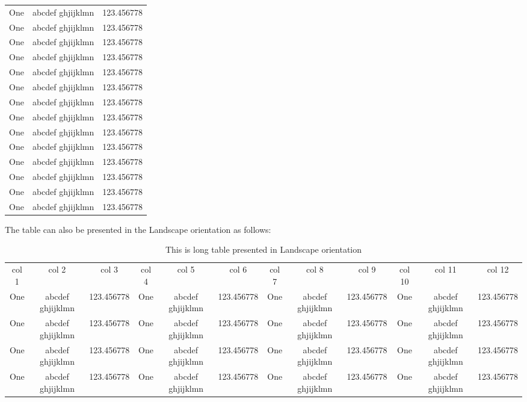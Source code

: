 \begin{longtable}{|l|l|l|}
	One & abcdef ghjijklmn & 123.456778 \\
	One & abcdef ghjijklmn & 123.456778 \\
	One & abcdef ghjijklmn & 123.456778 \\
	One & abcdef ghjijklmn & 123.456778 \\
	One & abcdef ghjijklmn & 123.456778 \\
	One & abcdef ghjijklmn & 123.456778 \\
	One & abcdef ghjijklmn & 123.456778 \\
	One & abcdef ghjijklmn & 123.456778 \\
	One & abcdef ghjijklmn & 123.456778 \\
	One & abcdef ghjijklmn & 123.456778 \\
	One & abcdef ghjijklmn & 123.456778 \\
	One & abcdef ghjijklmn & 123.456778 \\
	One & abcdef ghjijklmn & 123.456778 \\
	One & abcdef ghjijklmn & 123.456778 \\
\end{longtable}

The table can also be presented in the Landscape orientation as follows: 
\begin{table}
	\centering
	\caption{This is long table presented in Landscape orientation}
	\begin{tabular}{|c|c|c|c|c|c|c|c|c|c|c|c}
		\hline
		col 1 & col 2 & col 3 & col 4 & col 5 & col 6 & col 7 & col 8 & col 9 & col 10 & col 11 & col 12 \\
		One & abcdef ghjijklmn & 123.456778 & One & abcdef ghjijklmn & 123.456778 & One & abcdef ghjijklmn & 123.456778 & One & abcdef ghjijklmn &  123.456778 \\
		One & abcdef ghjijklmn & 123.456778 & One & abcdef ghjijklmn & 123.456778 & One & abcdef ghjijklmn & 123.456778 & One & abcdef ghjijklmn &  123.456778 \\
		One & abcdef ghjijklmn & 123.456778 & One & abcdef ghjijklmn & 123.456778 & One & abcdef ghjijklmn & 123.456778 & One & abcdef ghjijklmn &  123.456778 \\
		One & abcdef ghjijklmn & 123.456778 & One & abcdef ghjijklmn & 123.456778 & One & abcdef ghjijklmn & 123.456778 & One & abcdef ghjijklmn &  123.456778 \\
		\hline
	\end{tabular}
\end{table}	


